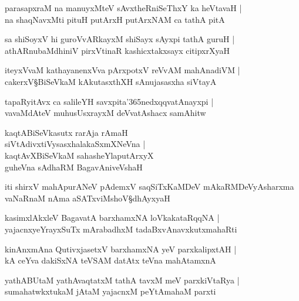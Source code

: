 \begin{shloka}
parasapxraM na manuyxMteV sAvxtheRniSeThxY ka heVtavaH |\\
na shaqNavxMti pituH putArxH putArxNAM ca tathA pitA 
\end{shloka}

\begin{shloka}
sa shiSoyxV hi guroVvARkayxM shiSayx sAyxpi tathA guruH |\\
athARnubaMdhiniV pirxVtinaR kashicxtakxsayx citipxrXyaH 
\end{shloka}

\begin{shloka}
iteyxVvaM kathayanenxVva pArxpotxV reVvAM mahAnadiVM |\\
cakerxV\S BiSeVkaM kAkutasxthXH sAnujasasxha siVtayA
\end{shloka}

\begin{shloka}
tapaRyitAvx ca salileYH savxpita\char'365nedxqqvatAnayxpi |\\
vavaMdAteV muhusUsxrayxM deVvatAshacx samAhitw
\end{shloka}

\begin{shloka}
kaqtABiSeVkasutx rarAja rAmaH \\
siVtAdivxtiVysasxhalakaSxmXNeVna |\\
kaqtAvXBiSeVkaM sahasheYlaputArxyX\\
guheVna sAdhaRM BagavAniveVshaH 
\end{shloka}
iti shirxV mahApurANeV pAdemxV saqSiTxKaMDeV mAkaRMDeVyAsharxma vaNaRnaM nAma aSATxviMshoV\S dhAyxyaH

\setcounter{shloka}{0}
\begin{shloka}
kasimxlAkxleV BagavatA barxhamxNA loVkakataRqqNA |\\
yajacnxyeYrayxSuTx mArabadhxM tadaBxvAnavxkutxmahaRti
\end{shloka}

\begin{shloka}
kinAnxmAna QutivxjasetxV barxhamxNA yeV parxkalipxtAH |\\
kA ceYva dakiSxNA teVSAM datAtx teVna mahAtamxnA 
\end{shloka}

\begin{shloka}
yathABUtaM yathAvaqtatxM tathA tavxM meV parxkiVtaRya |\\
sumahatwkxtukaM jAtaM yajacnxM peYtAmahaM parxti
\end{shloka}


